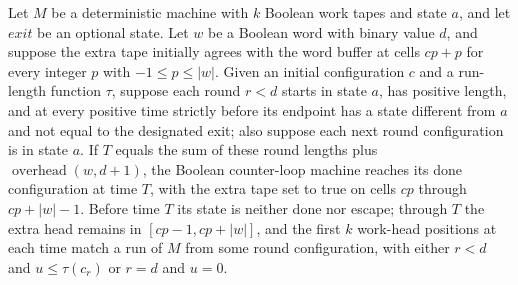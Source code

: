 \begin{theorem}
\label{Turing.counterLoopTM_run_done}
\leanok
{}
Let $M$ be a deterministic machine with $k$ Boolean work tapes and state $a$, and let
$exit$ be an optional state. Let $w$ be a Boolean word with binary value $d$, and
suppose the extra tape initially agrees with the word buffer at cells $cp+p$ for every
integer $p$ with $-1\le p\le |w|$. Given an initial configuration $c$ and a run-length
function $\tau$, suppose each round $r<d$ starts in state $a$, has positive length, and
at every positive time strictly before its endpoint has a state different from $a$ and
not equal to the designated exit; also suppose each next round configuration is in state
$a$. If $T$ equals the sum of these round lengths plus
$\operatorname{overhead}(w,d+1)$, the Boolean counter-loop machine reaches its done
configuration at time $T$, with the extra tape set to true on cells $cp$ through
$cp+|w|-1$. Before time $T$ its state is neither done nor escape; through $T$ the extra
head remains in $[cp-1,cp+|w|]$, and the first $k$ work-head positions at each time
match a run of $M$ from some round configuration, with either $r<d$ and
$u\le\tau(c_r)$ or $r=d$ and $u=0$.
\end{theorem}

